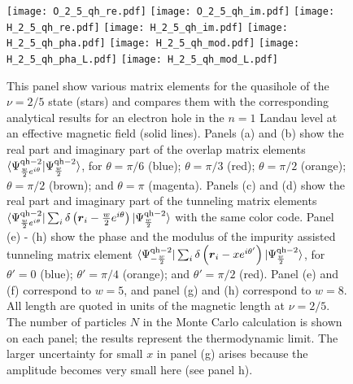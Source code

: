 \documentclass[twocolumn,floatfix,prb,aps,showpacs]{revtex4-2}
\renewcommand{\vec}[1]{\mbox{\boldmath$#1$}}
\begin{document}
\begin{appendix}
\begin{figure}[H]
	\texttt{[image: O\_2\_5\_qh\_re.pdf]} 
	\texttt{[image: O\_2\_5\_qh\_im.pdf]} 
    \texttt{[image: H\_2\_5\_qh\_re.pdf]} 
	\texttt{[image: H\_2\_5\_qh\_im.pdf]} 
    \texttt{[image: H\_2\_5\_qh\_pha.pdf]} 
	\texttt{[image: H\_2\_5\_qh\_mod.pdf]} 
   \texttt{[image: H\_2\_5\_qh\_pha\_L.pdf]} 
	\texttt{[image: H\_2\_5\_qh\_mod\_L.pdf]} 
	\caption{This panel show various matrix elements for the quasihole of the $\nu=2/5$ state (stars) and compares them with the corresponding analytical results for an electron hole in the $n=1$ Landau level at an effective magnetic field (solid lines). Panels (a) and (b) show the real part and imaginary part of the overlap matrix elements $\langle \Psi^{{\rm qh}-2}_{{w\over 2}e^{i\theta}}|\Psi^{{\rm qh}-2}_{w\over 2}\rangle$, for $\theta=\pi/6$ (blue); $\theta=\pi/3$ (red); $\theta=\pi/2$ (orange); $\theta=\pi/2$ (brown); and $\theta=\pi$ (magenta).  Panels (c) and (d) show the real part and imaginary part of the tunneling matrix elements $\langle \Psi^{{\rm qh}-2}_{{w\over 2}e^{i\theta}}|\sum_i \delta\left(\vec{r}_i-{w\over 2}e^{i\theta}\right)|\Psi^{{\rm qh}-2}_{w\over 2}\rangle$ with the same color code.   Panel (e) - (h) show the phase and the modulus of the impurity assisted tunneling matrix element $\langle \Psi^{{\rm qh}-2}_{-{w\over 2}}|\sum_i \delta\left(\vec{r}_i-xe^{i\theta'}\right)|\Psi^{{\rm qh}-2}_{w\over 2}\rangle$, for $\theta'=0$ (blue);  $\theta'=\pi/4$ (orange); and $\theta'=\pi/2$ (red). Panel (e) and (f) correspond to $w=5$, and panel (g) and (h) correspond to $w=8$. All length are quoted in units of the magnetic length at $\nu=2/5$. The number of particles $N$ in the Monte Carlo calculation is shown on each panel; the results represent the thermodynamic limit. The larger uncertainty for small $x$ in panel (g) arises because the amplitude becomes very small here (see panel h).
 }
	\label{O25qh}
\end{figure}




\end{appendix}
\end{document}
